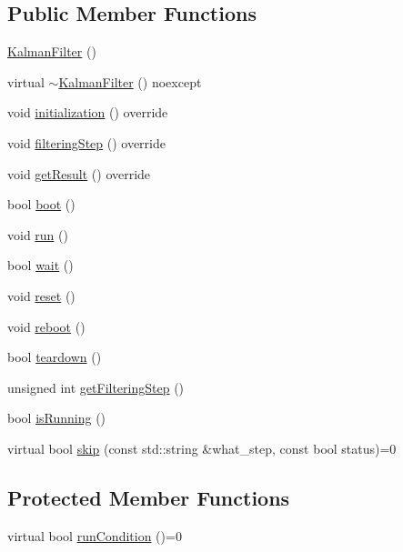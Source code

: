 \subsection*{Public Member Functions}
\begin{DoxyCompactItemize}
\item 
\mbox{\hyperlink{classbfl_1_1KalmanFilter_aab2cc3677e9fcb19fff16b84c997f30a}{Kalman\+Filter}} ()
\item 
virtual \mbox{\hyperlink{classbfl_1_1KalmanFilter_ae400948b72785980cef6fe0794e481fe}{$\sim$\+Kalman\+Filter}} () noexcept
\item 
void \mbox{\hyperlink{classbfl_1_1KalmanFilter_a34482fcfad20be0559cea9c060c5f949}{initialization}} () override
\item 
void \mbox{\hyperlink{classbfl_1_1KalmanFilter_aac6bd54422cba06e34cb93cb8a659950}{filtering\+Step}} () override
\item 
void \mbox{\hyperlink{classbfl_1_1KalmanFilter_a24484fb845495f43628db19062937548}{get\+Result}} () override
\item 
bool \mbox{\hyperlink{classbfl_1_1FilteringAlgorithm_a96651f8464190c0a56d79219a1017147}{boot}} ()
\item 
void \mbox{\hyperlink{classbfl_1_1FilteringAlgorithm_a009cbe5f4bbb16967f6c6ddcaed8fbb1}{run}} ()
\item 
bool \mbox{\hyperlink{classbfl_1_1FilteringAlgorithm_a40372c24fa050eb0274371172df0a244}{wait}} ()
\item 
void \mbox{\hyperlink{classbfl_1_1FilteringAlgorithm_a2403c62fbd7bd7f5cda56a84f5f30331}{reset}} ()
\item 
void \mbox{\hyperlink{classbfl_1_1FilteringAlgorithm_a6022859aa985474fb997343cc935b11e}{reboot}} ()
\item 
bool \mbox{\hyperlink{classbfl_1_1FilteringAlgorithm_a1dc912d89ee8f96d4f3e8209865c5308}{teardown}} ()
\item 
unsigned int \mbox{\hyperlink{classbfl_1_1FilteringAlgorithm_a8c43b1f3dac30934c0a03de348d4a29d}{get\+Filtering\+Step}} ()
\item 
bool \mbox{\hyperlink{classbfl_1_1FilteringAlgorithm_a5cfecab2c778620e2557237472bb1721}{is\+Running}} ()
\item 
virtual bool \mbox{\hyperlink{classbfl_1_1FilteringAlgorithm_ac8a718a614905d89d6a43bbbc70d68b2}{skip}} (const std\+::string \&what\+\_\+step, const bool status)=0
\end{DoxyCompactItemize}
\subsection*{Protected Member Functions}
\begin{DoxyCompactItemize}
\item 
virtual bool \mbox{\hyperlink{classbfl_1_1FilteringAlgorithm_a5fc12882356f6906b102fbfff2bc4b7c}{run\+Condition}} ()=0
\end{DoxyCompactItemize}


